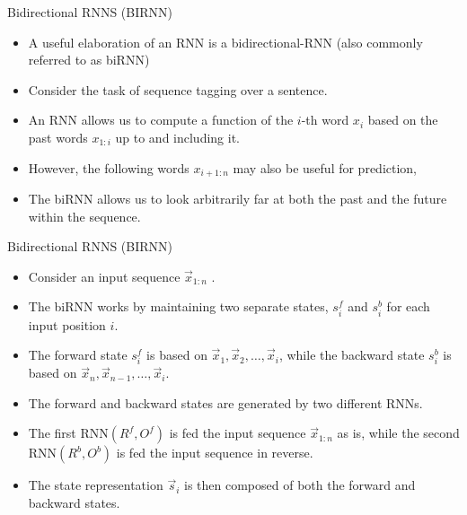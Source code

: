 \documentclass[handout]{beamer}
\begin{document}
\begin{frame}{Bidirectional RNNS (BIRNN)}
\begin{scriptsize}
\begin{itemize}
\item A useful elaboration of an RNN is a bidirectional-RNN (also commonly referred to as biRNN)
\item Consider the task of sequence tagging over a sentence.
\item An RNN allows us to compute a function of the $i$-th word $x_i$ based on the
past words $x_{1:i}$ up to and including it. 
\item However, the following words $x_{i+1:n}$ may also be useful for prediction,
\item The biRNN allows us to look arbitrarily far at both the past and the future within the sequence.
\end{itemize}
\end{scriptsize}
\end{frame}



\begin{frame}{Bidirectional RNNS (BIRNN)}
\begin{scriptsize}
\begin{itemize}
\item Consider an input sequence $\vec{x}_{1:n}$ . 
\item The biRNN works by maintaining two separate states, $s_{i}^{f}$ and $s_{i}^{b}$ for each input position $i$. 
\item The forward state $s_{i}^{f}$ is based on $\vec{x}_1, \vec{x}_2, \dots ,\vec{x}_i$, while the backward state $s_{i}^{b}$ is based on $\vec{x}_n, \vec{x}_{n-1}, \dots ,\vec{x}_i$.
\item The forward and backward states are generated
by two different RNNs.
\item The first RNN$(R^f, O^f)$  is fed the input sequence  $\vec{x}_{1:n}$ as is, while the second RNN$(R^b , O^b)$ is fed the input sequence in reverse.
\item The state representation $\vec{s}_i$ is then composed of both the forward and backward states.
\end{itemize}
\end{scriptsize}
\end{frame}
\end{document}
